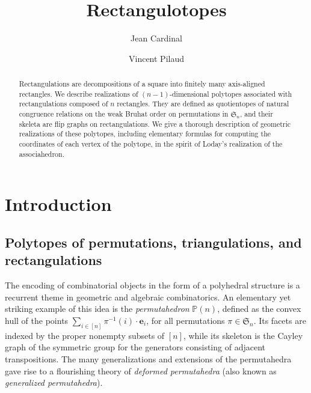 \documentclass{amsart}
\title{Rectangulotopes}
\author{Jean Cardinal}
\author{Vincent Pilaud}
\theoremstyle{definition}
\newcommand{\f}[1]{\mathfrak{#1}} %
\newcommand{\darkblue}{\color{darkblue}} %
\newcommand{\defn}[1]{\textsl{\darkblue #1}} %
\newcommand{\polytope}[1]{\mathds{#1}} %
\newcommand{\Perm}{\polytope{P}} %
\begin{document}
\begin{abstract}
  Rectangulations are decompositions of a square into finitely many axis-aligned rectangles.
  We describe realizations of $(n-1)$-dimensional polytopes associated with rectangulations composed of $n$ rectangles.
  They are defined as quotientopes of natural congruence relations on the weak Bruhat order on permutations in $\f{S}_n$, and their skeleta are flip graphs on rectangulations.
  We give a thorough description of geometric realizations of these polytopes, including elementary formulas for computing the coordinates of each vertex of the polytope, in the spirit of Loday's realization of the associahedron.
\end{abstract}

\maketitle

\tableofcontents


\section{Introduction}

\subsection{Polytopes of permutations, triangulations, and rectangulations}

The encoding of combinatorial objects in the form of a polyhedral structure is a recurrent theme in geometric and algebraic combinatorics. An elementary yet striking example of this idea is the \defn{permutahedron} $\Perm (n)$, defined as the convex hull of the points $\sum_{i\in [n]} \pi^{-1}(i)\cdot \mathbf{e}_i$, for all permutations $\pi\in\f{S}_n$. Its facets are indexed by the proper nonempty subsets of $[n]$, while its skeleton is the Cayley graph of the symmetric group for the generators consisting of adjacent transpositions. The many generalizations and extensions of the permutahedra gave rise to a flourishing theory of \defn{deformed permutahedra} (also known as \defn{generalized permutahedra}).
\end{document}
